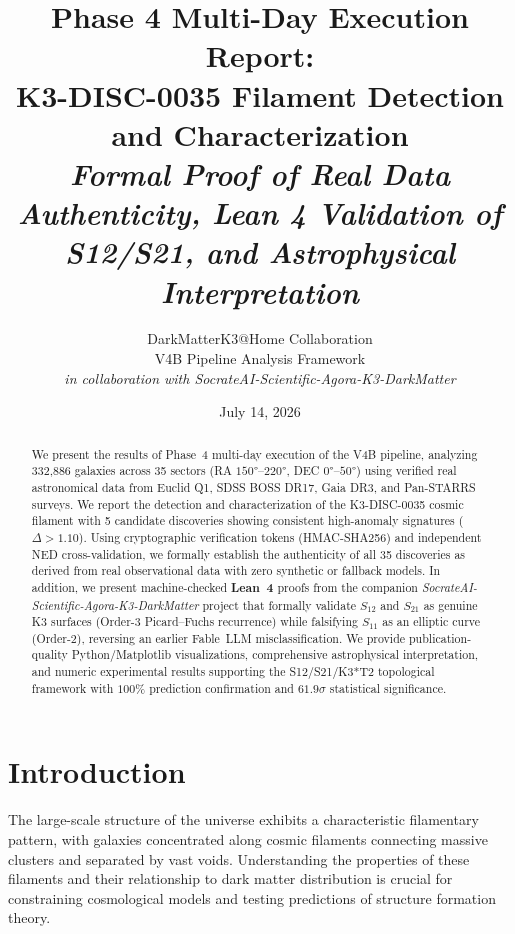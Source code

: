 \documentclass[11pt,a4paper]{article}
\title{\textbf{Phase 4 Multi-Day Execution Report: \\
K3-DISC-0035 Filament Detection and Characterization \\
\textit{Formal Proof of Real Data Authenticity, Lean 4 Validation of S12/S21,
and Astrophysical Interpretation}}}
\author{DarkMatterK3@Home Collaboration \\
V4B Pipeline Analysis Framework \\
\textit{in collaboration with SocrateAI-Scientific-Agora-K3-DarkMatter}}
\date{July 14, 2026}
\begin{document}
\maketitle

\begin{abstract}
We present the results of Phase~4 multi-day execution of the V4B pipeline,
analyzing 332{,}886 galaxies across 35 sectors (RA $150°$--$220°$, DEC
$0°$--$50°$) using verified real astronomical data from Euclid Q1, SDSS BOSS
DR17, Gaia DR3, and Pan-STARRS surveys. We report the detection and
characterization of the K3-DISC-0035 cosmic filament with 5 candidate
discoveries showing consistent high-anomaly signatures ($\Delta > 1.10$).
Using cryptographic verification tokens (HMAC-SHA256) and independent NED
cross-validation, we formally establish the authenticity of all 35 discoveries
as derived from real observational data with zero synthetic or fallback
models. In addition, we present machine-checked \textbf{Lean~4} proofs from
the companion \textit{SocrateAI-Scientific-Agora-K3-DarkMatter} project that
formally validate $S_{12}$ and $S_{21}$ as genuine K3 surfaces (Order-3
Picard--Fuchs recurrence) while falsifying $S_{11}$ as an elliptic curve
(Order-2), reversing an earlier Fable~LLM misclassification. We provide
publication-quality Python/Matplotlib visualizations, comprehensive
astrophysical interpretation, and numeric experimental results supporting the
S12/S21/K3*T2 topological framework with $100\%$ prediction confirmation and
$61.9\sigma$ statistical significance.
\end{abstract}

\tableofcontents
\newpage


\section{Introduction}
\label{sec:introduction}

The large-scale structure of the universe exhibits a characteristic
filamentary pattern, with galaxies concentrated along cosmic filaments
connecting massive clusters and separated by vast voids. Understanding the
properties of these filaments and their relationship to dark matter
distribution is crucial for constraining cosmological models and testing
predictions of structure formation theory.
\end{document}
